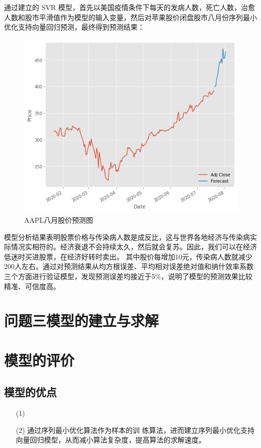 \documentclass{whutmod}
\begin{document}
通过建立的 SVR 模型，首先以美国疫情条件下每天的发病人数，死亡人数，治愈人数和股市平滑值作为模型的输入变量，然后对苹果股价闭盘股市八月份序列最小优化支持向量回归预测，最终得到预测结果：
           \begin{figure}[H]
   	\centering
   	\includegraphics[width=.8\textwidth]{figures/A5.png}
   	\caption{AAPL八月股价预测图}
   \end{figure}

模型分析结果表明股票价格与传染病人数是成反比，这与世界各地经济与传染病实际情况实相符的。经济衰退不会持续太久，然后就会复苏。因此，我们可以在经济低迷时买进股票，在经济好转时卖出。 其中股价每增加10元，传染病人数就减少200人左右。通过对预测结果从均方根误差、平均相对误差绝对值和纳什效率系数三个方面进行验证模型，发现预测误差均接近于5\%，说明了模型的预测效果比较精准、可信度高。

	
    \section{问题三模型的建立与求解}

 
  	\section{模型的评价}
		\subsection{模型的优点}
			\begin{itemize}                                             
			\item [(1)]
			\item [(2)]通过序列最小优化算法作为样本的训 练算法，进而建立序列最小优化支持向量回归模型，从而减小算法复杂度，提高算法的求解速度。
			
				
			\end{itemize}
\end{document}
